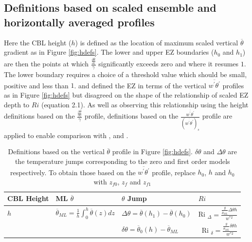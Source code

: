 \documentclass[referee]{svjour3}
\begin{document}
\subsection{Definitions based on scaled ensemble and horizontally averaged profiles}

Here the CBL height ($h$) is defined as the location of maximum scaled vertical $\overline{\theta}$ gradient as in Figure \ref{fig:hdefs}.  The lower and upper EZ boundaries ($h_{0}$ and $h_{1}$) are then the points at which $\frac{\frac{\partial \overline{\theta}}{\partial z}}{\gamma}$ significantly exceeds zero and where it resumes $1$.  The lower boundary requires a choice of a threshold value which should be small, positive and less than $1$. \cite{Fedorovich04} and \cite{Brooks12} defined the EZ in terms of the vertical $\overline{w^{'}\theta^{'}}$ profiles as in Figure \ref{fig:hdefs} but disagreed on the shape of the relationship of scaled EZ depth to $Ri$ (equation 2.1).  As well as observing this relationship using the height definitions based on the $\frac{\frac{\partial \overline{\theta}}{\partial z}}{\gamma}$ profile, definitions based on the $\frac{\overline{w^{'}\theta^{'}}}{(\overline{w^{'}\theta^{'}})_{s}}$ profile are applied to enable comparison with \cite{Brooks12}, \cite{Fedorovich04} and \cite{Garcia14}.\\  

\begin{table}[htbp]
\caption[Height definitions]{Definitions based on the vertical $\overline{\theta}$ profile in Figure \ref{fig:hdefs}. $\delta \theta$ and $\Delta \theta$ are the temperature jumps corresponding to the zero and first order models respectively. To obtain those based on the $\overline{w^{'}\theta^{'}}$ profile, replace $h_{0}$, $h$ and $h_{0}$ with $z_{f0}$, $z_{f}$ and $z_{f1}$}


    \begin{tabular}{p{} p{} p{3cm} p{2.5cm}}
    
      CBL Height & ML $\overline{\theta}$ & $\theta$ Jump &$     Ri $\\ \hline 
       $h$ & $\overline{\theta}_{ML} = \frac{1}{h}\int^{h}_{0}\overline{\theta}(z)dz$ & $\Delta \theta=\overline{\theta}(h_{1})-\overline{\theta}(h_{0})$ &      Ri $_{\Delta}=\frac{\frac{g}{\overline{\theta}_{ML}}\Delta \theta h}{w^{*2}}$  \\ [.3cm] 
        
       & &$\delta \theta = \overline{\theta}_{0}(h)- \overline{\theta}_{ML}$ & \    Ri $_{\delta}=\frac{\frac{g}{\overline{\theta}_{ML}} \delta \theta h}{w^{*2}}$ \\ \hline
      \end{tabular}

\label{tab:reldefs}   
    
\end{table}
\end{document}
